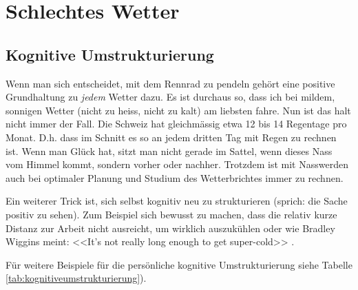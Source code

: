 \chapter{Schlechtes Wetter}


\section{Kognitive Umstrukturierung}

Wenn man sich entscheidet, mit dem Rennrad zu pendeln gehört eine positive Grundhaltung zu \emph{jedem} Wetter dazu.
Es ist durchaus so, dass ich bei mildem, sonnigen Wetter (nicht zu heiss, nicht zu kalt) am liebsten fahre.
Nun ist das halt nicht immer der Fall. Die Schweiz hat gleichmässig etwa 12 bis 14 Regentage pro Monat.
D.h. dass im Schnitt es so an jedem dritten Tag mit Regen zu rechnen ist.
Wenn man Glück hat, sitzt man nicht gerade im Sattel, wenn dieses Nass vom Himmel kommt, sondern vorher oder nachher.
Trotzdem ist mit Nasswerden auch bei optimaler Planung und Studium des Wetterbrichtes immer zu rechnen.

Ein weiterer Trick ist, sich selbst kognitiv neu zu strukturieren (sprich: die Sache positiv zu sehen).
Zum Beispiel sich bewusst zu machen, dass die relativ kurze Distanz zur Arbeit nicht ausreicht, 
um wirklich auszukühlen oder wie Bradley Wiggins meint: <<It's not really long enough to get super-cold>> \cite{bbc2015wigginswinter}.

Für weitere Beispiele für die persönliche kognitive Umstrukturierung siehe Tabelle \ref{tab:kognitiveumstrukturierung}).

